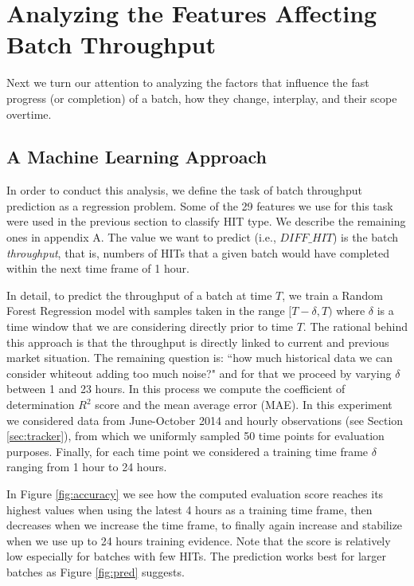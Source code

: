 \section{Analyzing the Features Affecting Batch Throughput}
\label{sec:throughput}
Next we turn our attention to analyzing the factors that influence the fast progress (or completion) of a batch, how they change, interplay, and their scope overtime.
\subsection{A Machine Learning Approach}
In order to conduct this analysis, we define the task of batch throughput prediction as a regression problem.  Some of the  29  features we use for this task were used in the previous section to classify HIT type.  We describe the remaining ones in appendix A. The value  we want to predict (i.e.,   $DIFF\_HIT$) is the batch \emph{throughput}, that is, numbers of HITs that  a given batch would have completed within the next time frame of 1 hour.

In detail, to predict the throughput of a batch at time $T$, we train a Random Forest Regression model with samples taken in the range $[T-\delta, T)$ where $\delta$ is a time window that we are   considering directly prior to time $T$. The rational behind this approach is that the throughput is directly linked to current and previous market situation. 
The remaining question is: ``how much historical data we can consider whiteout adding too much noise?" and for that we proceed by varying $\delta$ between 1 and 23 hours.
In this process we compute the coefficient of determination  $R^2$ score \cite{sklearn,sklearnweb} and the mean average error (MAE).
In this experiment we considered  data from June-October 2014 and hourly observations (see Section \ref{sec:tracker}), from which we uniformly sampled 50 time points for evaluation purposes. Finally, for each time point we considered a training time frame $\delta$ ranging from 1 hour to 24 hours. 

In Figure \ref{fig:accuracy} we see how the computed evaluation score reaches its highest values when using the latest 4 hours as a training time frame, then decreases when we increase the time frame, to finally again increase and stabilize when we use up to 24 hours training evidence.
Note that the score is relatively low especially for batches with few HITs. The prediction works best for larger batches as Figure \ref{fig:pred} suggests.

